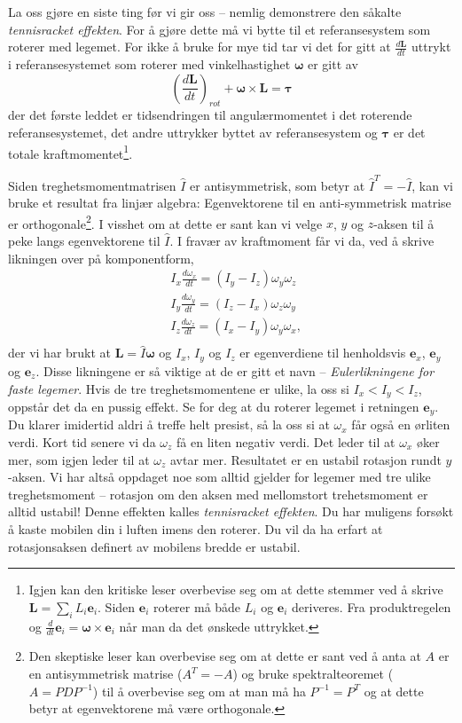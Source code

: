 \documentclass[twoside,utf8]{article}
\begin{document}
La oss gjøre en siste ting før vi gir oss -- nemlig demonstrere den såkalte \textit{tennisracket effekten}. For å gjøre dette må vi bytte til et referansesystem som roterer med legemet. For ikke å bruke for mye tid tar vi det for gitt at $\frac{d\mathbf{L}}{dt}$ uttrykt i referansesystemet som roterer med vinkelhastighet $\pmb{\omega}$ er gitt av
\[
  \left(\frac{d\mathbf{L}}{dt}\right)_{rot} + \pmb{\omega}\times \mathbf{L} = \pmb{\tau}
\]
der det første leddet er tidsendringen til angulærmomentet i det roterende referansesystemet, det andre uttrykker byttet av referansesystem og $\pmb{\tau}$ er det totale kraftmomentet\footnote{Igjen kan den kritiske leser overbevise seg om at dette stemmer ved å skrive $\mathbf{L}=\sum_i L_i\mathbf{e}_i$. Siden $\mathbf{e}_i$ roterer må både $L_i$ og $\mathbf{e}_i$ deriveres. Fra produktregelen og $\frac{d}{dt}\mathbf{e}_i=\pmb{\omega}\times \mathbf{e}_i$ når man da det ønskede uttrykket.}.

Siden treghetsmomentmatrisen $\hat{I}$ er antisymmetrisk, som betyr at $\hat{I}^T=-\hat{I}$, kan vi bruke et resultat fra linjær algebra: Egenvektorene til en anti-symmetrisk matrise er orthogonale\footnote{Den skeptiske leser kan overbevise seg om at dette er sant ved å anta at $A$ er en antisymmetrisk matrise ($A^T=-A$) og bruke spektralteoremet ($A=PDP^{-1}$) til å overbevise seg om at man må ha $P^{-1}=P^T$ og at dette betyr at egenvektorene må være orthogonale.}. I visshet om at dette er sant kan vi velge $x$, $y$ og $z$-aksen til å peke langs egenvektorene til $\hat{I}$. I fravær av kraftmoment får vi da, ved å skrive likningen over på komponentform,
\begin{align*}
  & I_x \frac{d\omega_x}{dt} = (I_y-I_z)\omega_y \omega_z \\
  & I_y \frac{d\omega_y}{dt} = (I_z-I_x)\omega_z \omega_y \\
  & I_z \frac{d\omega_z}{dt} = (I_x-I_y)\omega_y \omega_x, \\
\end{align*}
der vi har brukt at $\mathbf{L}=\hat{I}\pmb{\omega}$ og $I_x$, $I_y$ og $I_z$ er egenverdiene til henholdsvis $\mathbf{e}_x$, $\mathbf{e}_y$ og $\mathbf{e}_z$. Disse likningene er så viktige at de er gitt et navn --  \textit{Eulerlikningene for faste legemer}. Hvis de tre treghetsmomentene er ulike, la oss si $I_x < I_y < I_z$, oppstår det da en pussig effekt. Se for deg at du roterer legemet i retningen $\mathbf{e}_y$. Du klarer imidertid aldri å treffe helt presist, så la oss si at $\omega_x$ får også en ørliten verdi.
Kort tid senere vi da $\omega_z$ få en liten negativ verdi. Det leder til at $\omega_x$ øker mer, som igjen leder til at $\omega_z$ avtar mer. Resultatet er en ustabil rotasjon rundt $y$-aksen. Vi har altså oppdaget noe som alltid gjelder for legemer med tre ulike treghetsmoment -- rotasjon om den aksen med mellomstort trehetsmoment er alltid ustabil! Denne effekten kalles \textit{tennisracket effekten}. Du har muligens forsøkt å kaste mobilen din i luften imens den roterer. Du vil da ha erfart at rotasjonsaksen definert av mobilens bredde er ustabil.
\end{document}
